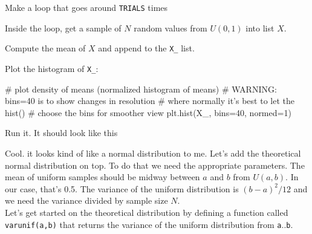 \begin{fullwidth}
\step Make a loop that goes around {\tt TRIALS} times

\step Inside the loop, get a sample of $N$ random values from $U(0,1)$ into list $X$.

\step Compute the mean of $X$ and append to the {\tt X\_} list.

\step Plot the histogram of {\tt X\_}:

\begin{pyverbatim}
# plot density of means (normalized histogram of means)
# WARNING: bins=40 is to show changes in resolution
#          where normally it's best to let the hist()
#          choose the bins for smoother view
plt.hist(X_, bins=40, normed=1)
\end{pyverbatim}

\step Run it. It should look like this \\


Cool. it looks kind of like a normal distribution to me. Let's add the theoretical normal distribution on top. To do that we need the appropriate parameters. The mean of uniform samples should be midway between $a$ and $b$ from $U(a,b)$. In our case, that's 0.5. The variance of the uniform distribution is $(b-a)^2/12$ and we need the variance divided by sample size $N$. \\

\step  Let's get started on the theoretical distribution by defining a function called {\tt varunif(a,b)} that returns the variance of the uniform distribution from {\tt a}..{\tt b}.  


\end{fullwidth}
